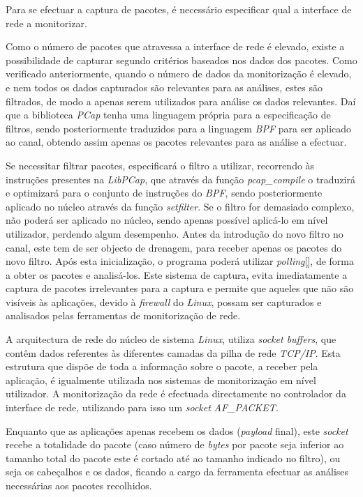 Para se efectuar a captura de pacotes, é necessário especificar qual a interface de rede a monitorizar.

Como o número de pacotes que atravessa a interface de rede é elevado, existe a possibilidade de capturar segundo critérios baseados nos dados dos pacotes.
Como verificado anteriormente, quando o número de dados da monitorização é elevado, e nem todos os dados capturados são relevantes para as análises, estes são filtrados, de modo a apenas serem utilizados para análise os dados relevantes.
Daí que a biblioteca \textit{PCap} tenha uma linguagem própria para a especificação de filtros, sendo posteriormente traduzidos para a linguagem \textit{BPF} para ser aplicado ao canal, obtendo assim apenas os pacotes relevantes para as análise a efectuar.

Se necessitar filtrar pacotes, especificará o filtro a utilizar, recorrendo às instruções presentes na \textit{LibPCap}, que através da função  \textit{pcap\_compile} o traduzirá e optimizará para o conjunto de instruções do \textit{BPF}, sendo posteriormente aplicado no núcleo através da função \textit{setfilter}.
Se o filtro for demasiado complexo, não poderá ser aplicado no núcleo, sendo apenas possível aplicá-lo em nível utilizador, perdendo algum desempenho.
Antes da introdução do novo filtro no canal, este tem de ser objecto de drenagem, para receber apenas os pacotes do novo filtro.
Após esta inicialização, o programa poderá utilizar \textit{polling}\ref{}, de forma a obter os pacotes e analisá-los.
Este sistema de captura, evita imediatamente a captura de pacotes irrelevantes para a captura e permite que aqueles que não são visíveis às aplicações, devido à \textit{firewall} do \textit{Linux}, possam ser capturados e analisados pelas ferramentas de monitorização de rede.

A arquitectura de rede do núcleo de sistema \textit{Linux}, utiliza \textit{socket buffers}, que contêm dados referentes às diferentes camadas da pilha de rede \textit{TCP/IP}.
Esta estrutura que dispõe de toda a informação sobre o pacote, a receber pela aplicação, é igualmente utilizada nos sistemas de monitorização em nível utilizador.
A monitorização da rede é efectuada directamente no controlador da interface de rede, utilizando para isso um \textit{socket} \textit{AF\_PACKET}.

Enquanto que as aplicações apenas recebem os dados (\textit{payload} final), este \textit{socket} recebe a totalidade do pacote (caso número de \textit{bytes} por pacote seja inferior ao tamanho total do pacote este é cortado até ao tamanho indicado no filtro), ou seja os cabeçalhos e os dados, ficando a cargo da ferramenta efectuar as análises necessárias aos pacotes recolhidos.

